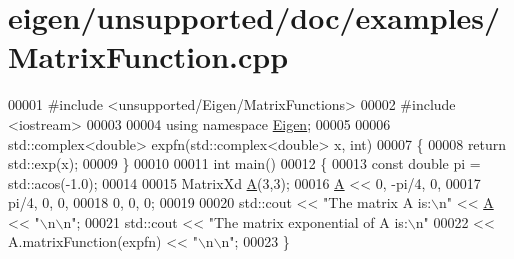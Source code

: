 \hypertarget{eigen_2unsupported_2doc_2examples_2_matrix_function_8cpp_source}{}\section{eigen/unsupported/doc/examples/\+Matrix\+Function.cpp}
\label{eigen_2unsupported_2doc_2examples_2_matrix_function_8cpp_source}

\begin{DoxyCode}
00001 \textcolor{preprocessor}{#include <unsupported/Eigen/MatrixFunctions>}
00002 \textcolor{preprocessor}{#include <iostream>}
00003 
00004 \textcolor{keyword}{using namespace }\hyperlink{namespace_eigen}{Eigen};
00005 
00006 std::complex<double> expfn(std::complex<double> x, \textcolor{keywordtype}{int})
00007 \{
00008   \textcolor{keywordflow}{return} std::exp(x);
00009 \}
00010 
00011 \textcolor{keywordtype}{int} main()
00012 \{
00013   \textcolor{keyword}{const} \textcolor{keywordtype}{double} pi = std::acos(-1.0);
00014 
00015   MatrixXd \hyperlink{group___core___module_class_eigen_1_1_matrix}{A}(3,3);
00016   \hyperlink{group___core___module_class_eigen_1_1_matrix}{A} << 0,    -pi/4, 0,
00017        pi/4, 0,     0,
00018        0,    0,     0;
00019 
00020   std::cout << \textcolor{stringliteral}{"The matrix A is:\(\backslash\)n"} << \hyperlink{group___core___module_class_eigen_1_1_matrix}{A} << \textcolor{stringliteral}{"\(\backslash\)n\(\backslash\)n"};
00021   std::cout << \textcolor{stringliteral}{"The matrix exponential of A is:\(\backslash\)n"} 
00022             << A.matrixFunction(expfn) << \textcolor{stringliteral}{"\(\backslash\)n\(\backslash\)n"};
00023 \}
\end{DoxyCode}
